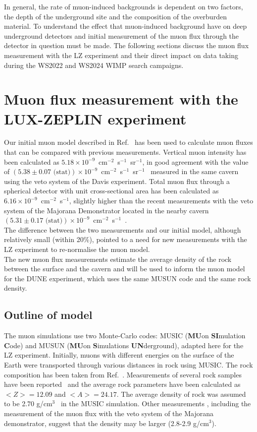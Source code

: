 In general, the rate of muon-induced backgrounds is dependent on two factors, the depth of the underground site and the composition of the overburden material. To understand the effect that muon-induced background have on deep underground detectors and initial measurement of the muon flux through the detector in question must be made. The following sections discuss the muon flux measurement with the LZ experiment and their direct impact on data taking during the WS2022 and WS2024 WIMP search campaigns.  

\section{Muon flux measurement with the LUX-ZEPLIN experiment}\label{sec:Muons/MuonFluxMeasurementWithLZ}
Our initial muon model described in Ref.~\cite{LZ_SIMS} has been used to calculate muon fluxes that can be compared with previous measurements. Vertical muon intensity has been calculated as $5.18\times10^{-9}$~cm$^{-2}$~s$^{-1}$~sr$^{-1}$, in good agreement with the value of $(5.38\pm0.07\text{ (stat)})\times10^{-9}$~cm$^{-2}$~s$^{-1}$~sr$^{-1}$~\cite{Cherry} measured in the same cavern using the veto system of the Davis experiment. Total muon flux through a spherical detector with unit cross-sectional area has been calculated as $6.16\times10^{-9}$~cm$^{-2}$~s$^{-1}$, slightly higher than the recent measurements with the veto system of the Majorana Demonstrator located in the nearby cavern $(5.31\pm0.17 \text{ (stat)})\times10^{-9}$~cm$^{-2}$~s$^{-1}$~\cite{majorana}.\\
The difference between the two measurements and our initial model, although relatively small (within 20\%), pointed to a need for new measurements with the LZ experiment to re-normalise the muon model.\\
The new muon flux measurements estimate the average density of the rock between the surface and the cavern and will be used to inform the muon model for the DUNE experiment\cite{DUNE}, which uses the same MUSUN code and the same rock density.

\subsection{Outline of model}
The muon simulations use two Monte-Carlo codes: MUSIC (\textbf{MU}on \textbf{SI}mulation \textbf{C}ode) and MUSUN (\textbf{MU}on \textbf{S}imulations \textbf{UN}derground)\cite{music,musun}, adapted here for the LZ experiment. Initially, muons with different energies on the surface of the Earth were transported through various distances in rock using MUSIC. The rock composition has been taken from Ref.~\cite{mei,zhang}. Measurements of several rock samples have been reported~\cite{mei,zhang} and the average rock parameters have been calculated as $<Z>=12.09$ and $<A>=24.17$. The average density of rock was assumed to be 2.70 g/cm$^3$~\cite{zhang} in the MUSIC simulation. Other measurements \cite{heise}, including the measurement of the muon flux with the veto system of the Majorana demonstrator, suggest that the density may be larger (2.8-2.9 g/cm$^3$\cite{majorana}).

